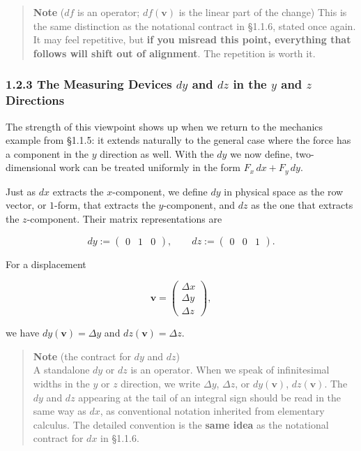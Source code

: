 \begin{quote}
\textbf{Note} (\(df\) is an operator; \(df(\mathbf{v})\) is the linear
part of the change) This is the same distinction as the notational
contract in §1.1.6, stated once again. It may feel repetitive, but
\textbf{if you misread this point, everything that follows will shift out of alignment}.
The repetition is worth it.
\end{quote}

\hypertarget{the-measuring-devices-dy-and-dz-in-the-y-and-z-directions}{%
\subsubsection{\texorpdfstring{1.2.3 The Measuring Devices \(dy\) and
\(dz\) in the \(y\) and \(z\)
Directions}{1.2.3 The Measuring Devices dy and dz in the y and z Directions}}\label{the-measuring-devices-dy-and-dz-in-the-y-and-z-directions}}

The strength of this viewpoint shows up when we return to the mechanics
example from §1.1.5: it extends naturally to the general case where the
force has a component in the \(y\) direction as well. With the \(dy\) we
now define, two-dimensional work can be treated uniformly in the form
\(F_x\,dx+F_y\,dy\).

Just as \(dx\) extracts the \(x\)-component, we define \(dy\) in
physical space as the row vector, or \(1\)-form, that extracts the
\(y\)-component, and \(dz\) as the one that extracts the
\(z\)-component. Their matrix representations are

\[
dy:=\begin{pmatrix}0&1&0\end{pmatrix},\qquad
dz:=\begin{pmatrix}0&0&1\end{pmatrix}.
\]

For a displacement

\[
\mathbf{v}=\begin{pmatrix}\Delta x\\\Delta y\\\Delta z\end{pmatrix},
\]

we have \(dy(\mathbf{v})=\Delta y\) and \(dz(\mathbf{v})=\Delta z\).

\begin{quote}
\textbf{Note} (the contract for \(dy\) and \(dz\))\\
A standalone \(dy\) or \(dz\) is an operator. When we speak of
infinitesimal widths in the \(y\) or \(z\) direction, we write
\(\Delta y\), \(\Delta z\), or \(dy(\mathbf{v})\), \(dz(\mathbf{v})\).
The \(dy\) and \(dz\) appearing at the tail of an integral sign should
be read in the same way as \(dx\), as conventional notation inherited
from elementary calculus. The detailed convention is the
\textbf{same idea} as the notational contract for \(dx\) in §1.1.6.
\end{quote}

